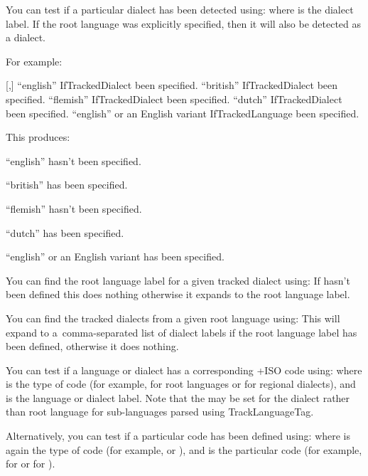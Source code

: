\documentclass[titlepage=false,oneside,
 fontsize=12pt,captions=tableheading]{scrbook}
\begin{document}
You can test if a particular dialect has been detected using:
where  is the dialect label. If the root
language was explicitly specified, then it will also be detected as
a dialect.

For example:
\begin{codebox}
[,]
\codepar
{}
\codepar
{}
``english'' \gls{IfTrackedDialect} been specified.
\codepar
``british'' \gls{IfTrackedDialect} been specified.
\codepar
``flemish'' \gls{IfTrackedDialect} been specified.
\codepar
``dutch'' \gls{IfTrackedDialect} been specified.
\codepar
``english'' or an English variant 
\gls{IfTrackedLanguage} been specified.
\end{codebox}
This produces:
\begin{resultbox}
``english'' hasn't been specified.

``british'' has been specified.

``flemish'' hasn't been specified.

``dutch'' has been specified.

``english'' or an English variant has been specified.
\end{resultbox}

You can find the root language label for a given tracked dialect
using:
If  hasn't been defined this does nothing otherwise it
expands to the root language label.

You can find the tracked dialects from a given root language
using:
This will expand to a~comma-separated list of dialect labels
if the root language label has been defined, otherwise it
does nothing.

You can test if a language or dialect has a corresponding \idx+{ISO} code using:
where  is the type of  code (for example,
 for root languages or  for regional
dialects), and  is the language or dialect label.
Note that the  may be set for the dialect
rather than root language for sub-languages parsed using
\gls{TrackLanguageTag}.

Alternatively, you can test if a particular  code has been
defined using:
where  is again the type of  code (for example,
 or ), and  is the
particular code (for example,  for  or
 for ).
\end{document}
